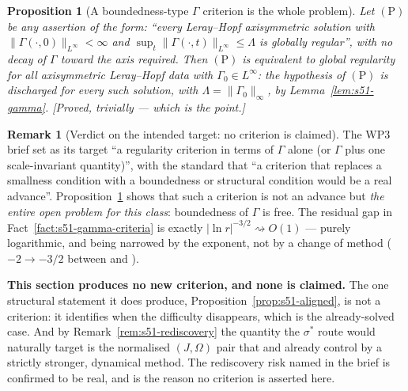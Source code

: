 \documentclass[11pt]{article}
\newtheorem{proposition}[theorem]{Proposition}
\theoremstyle{definition}
\newtheorem{remark}[theorem]{Remark}
\theoremstyle{remark}
\begin{document}
\begin{proposition}[A boundedness-type $\Gamma$ criterion is the whole problem]
  \label{prop:s51-boundedness}
  Let $(\mathrm{P})$ be any assertion of the form: ``every Leray--Hopf
  axisymmetric solution with $\|\Gamma(\cdot,0)\|_{L^\infty}<\infty$ and
  $\sup_t\|\Gamma(\cdot,t)\|_{L^\infty}\leq\Lambda$ is globally regular'',
  with no decay of $\Gamma$ toward the axis required. Then $(\mathrm{P})$ is
  equivalent to global regularity for all axisymmetric Leray--Hopf data with
  $\Gamma_0\in L^\infty$: the hypothesis of $(\mathrm{P})$ is discharged for
  every such solution, with $\Lambda=\|\Gamma_0\|_\infty$, by
  Lemma~\ref{lem:s51-gamma}. \emph{[Proved, trivially --- which is the point.]}
\end{proposition}

\begin{remark}[Verdict on the intended target: no criterion is claimed]
  \label{rem:s51-no-criterion}
  The WP3 brief set as its target ``a regularity criterion in terms of
  $\Gamma$ alone (or $\Gamma$ plus one scale-invariant quantity)'', with the
  standard that ``a criterion that replaces a smallness condition with a
  boundedness or structural condition would be a real advance''.
  Proposition~\ref{prop:s51-boundedness} shows that such a criterion is not an
  advance but \emph{the entire open problem for this class}: boundedness of
  $\Gamma$ is free. The residual gap in
  Fact~\ref{fact:s51-gamma-criteria} is exactly
  $|\ln r|^{-3/2}\rightsquigarrow O(1)$ --- purely logarithmic, and being
  narrowed by the exponent, not by a change of method
  ($-2\to-3/2$ between \cite{LeiZhang2017} and \cite{Wei2016}).

  \textbf{This section produces no new criterion, and none is claimed.} The
  one structural statement it does produce,
  Proposition~\ref{prop:s51-aligned}, is not a criterion: it identifies when
  the difficulty disappears, which is the already-solved case. And by
  Remark~\ref{rem:s51-rediscovery} the quantity the $\sigma^*$ route would
  naturally target is the normalised $(J,\Omega)$ pair that
  \cite{ChenFangZhang2017} and \cite{LeiZhang2017} already control by a
  strictly stronger, dynamical method. The rediscovery risk named in the brief
  is confirmed to be real, and is the reason no criterion is asserted here.
\end{remark}
\end{document}

